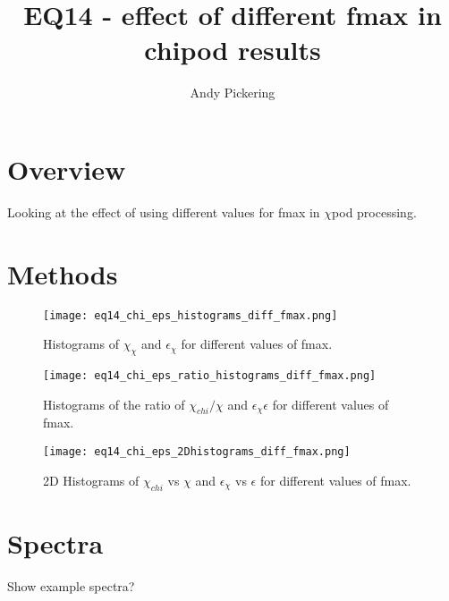\documentclass[11pt]{article}
\title{EQ14 - effect of different fmax in chipod results}
\author{Andy Pickering}
\begin{document}
\maketitle

\tableofcontents
\newpage

\section{Overview}

Looking at the effect of using different values for fmax in $\chi$pod processing. 





\section{Methods}

\begin{itemize}


\end{itemize}


\begin{figure}[htbp]
\texttt{[image: eq14\_chi\_eps\_histograms\_diff\_fmax.png]}
\caption{Histograms of $\chi_{\chi}$ and $\epsilon_{\chi}$ for different values of fmax.}
\label{}
\end{figure}

\begin{figure}[htbp]
\texttt{[image: eq14\_chi\_eps\_ratio\_histograms\_diff\_fmax.png]}
\caption{Histograms of the ratio of  $\chi_{chi}/\chi$ and $\epsilon_{\chi}\epsilon$ for different values of fmax.}
\label{}
\end{figure}



\begin{figure}[htbp]
\texttt{[image: eq14\_chi\_eps\_2Dhistograms\_diff\_fmax.png]}
\caption{2D Histograms of $\chi_{chi}$ vs $\chi$ and $\epsilon_{\chi}$ vs $\epsilon$ for different values of fmax.}
\label{}
\end{figure}



\section{Spectra}

Show example spectra?
\end{document}
